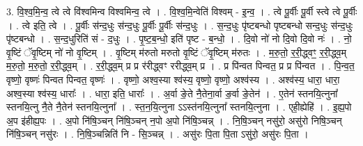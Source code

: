 \documentclass[17pt]{extarticle}
\begin{document}
3. वि॒श्व॒मि॒न्व॒ त्वे त्वे वि॑श्वमिन्व विश्वमिन्व॒ त्वे । . वि॒श्व॒मि॒न्वेति॑ विश्वम् - इ॒न्व॒ । . त्वे पू॒र्वीः पू॒र्वी स्त्वे त्वे पू॒र्वीः । . त्वे इति॒ त्वे । . पू॒र्वीः स॑न्द॒धुः स॑न्द॒धुः पू॒र्वीः पू॒र्वीः स॑न्द॒धुः । . स॒न्द॒धुः पृ॑ष्टबन्धो पृष्टबन्धो सन्द॒धुः स॑न्द॒धुः पृ॑ष्टबन्धो । . स॒न्द॒धुरिति॑ सं - द॒धुः । . पृ॒ष्ट॒ब॒न्धो॒ इति॑ पृष्ट - ब॒न्धो॒ । . दि॒वो नो॑ नो दि॒वो दि॒वो नः॑ । . नो॒ वृ॒ष्टिं ॅवृ॒ष्टिम् नो॑ नो वृ॒ष्टिम् । . वृ॒ष्टिम् म॑रुतो मरुतो वृ॒ष्टिं ॅवृ॒ष्टिम् म॑रुतः । . म॒रु॒तो॒ र॒री॒द्ध्वꣳ॒॒ र॒री॒द्ध्व॒म् म॒रु॒तो॒ म॒रु॒तो॒ र॒री॒द्ध्व॒म् । . र॒री॒द्ध्व॒म् प्र प्र र॑रीद्ध्वꣳ ररीद्ध्व॒म् प्र । . प्र पि॑न्वत पिन्वत॒ प्र प्र पि॑न्वत । . पि॒न्व॒त॒ वृष्णो॒ वृष्णः॑ पिन्वत पिन्वत॒ वृष्णः॑ । . वृष्णो॒ अश्व॒स्या श्व॑स्य॒ वृष्णो॒ वृष्णो॒ अश्व॑स्य । . अश्व॑स्य॒ धारा॒ धारा॒ अश्व॒स्या श्व॑स्य॒ धाराः᳚ । . धारा॒ इति॒ धाराः᳚ । . अ॒र्वा ङे॒ते नै॒तेना॒र्वा ङ॒र्वा ङे॒तेन॑ । . ए॒तेन॑ स्तनयि॒त्नुना᳚ स्तनयि॒त्नु नै॒ते नै॒तेन॑ स्तनयि॒त्नुना᳚ । . स्त॒न॒यि॒त्नुना ऽऽस्त॑नयि॒त्नुना᳚ स्तनयि॒त्नुना । . एही॒ह्येहि॑ । . इ॒ह्य॒पो अ॒प इ॑हीह्य॒पः । . अ॒पो नि॑षि॒ञ्चन् नि॑षि॒ञ्चन् न॒पो अ॒पो नि॑षि॒ञ्चन्न् । . नि॒षि॒ञ्चन् नसु॑रो॒ असु॑रो निषि॒ञ्चन् नि॑षि॒ञ्चन् नसु॑रः । . नि॒षि॒ञ्चन्निति॑ नि - सि॒ञ्चन्न् । . असु॑रः पि॒ता पि॒ता ऽसु॑रो॒ असु॑रः पि॒ता । \newline
\end{document}

